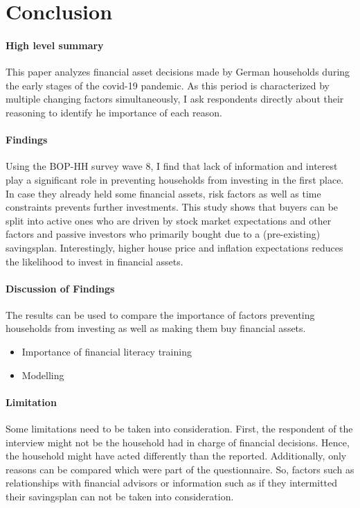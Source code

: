 \documentclass[ProjectABM]{subfiles}
\begin{document}
\section{Conclusion}\label{sec:conclusion}
\paragraph{High level summary}
This paper analyzes financial asset decisions made by German households during the early stages of the covid-19 pandemic. As this period is characterized by multiple changing factors simultaneously, I ask respondents directly about their reasoning to identify he importance of each reason. 

\paragraph{Findings}
Using the BOP-HH survey wave 8, I find that lack of information and interest play a significant role in preventing households from investing in the first place. In case they already held some financial assets, risk factors as well as time constraints prevents further investments. This study shows that buyers can be split into active ones who are driven by stock market expectations and other factors and passive investors who primarily bought due to a (pre-existing) savingsplan. Interestingly, higher house price and inflation expectations reduces the likelihood to invest in financial assets.

\paragraph{Discussion of Findings}
The results can be used to compare the importance of factors preventing households from investing as well as making them buy financial assets.
\begin{itemize}
	\item Importance of financial literacy training
	\item Modelling
\end{itemize}

\paragraph{Limitation}
Some limitations need to be taken into consideration. First, the respondent of the interview might not be the household had in charge of financial decisions. Hence, the household might have acted differently than the reported. Additionally, only reasons can be compared which were part of the questionnaire. So, factors such as relationships with financial advisors or information such as if they intermitted their savingsplan can not be taken into consideration.
\end{document}

